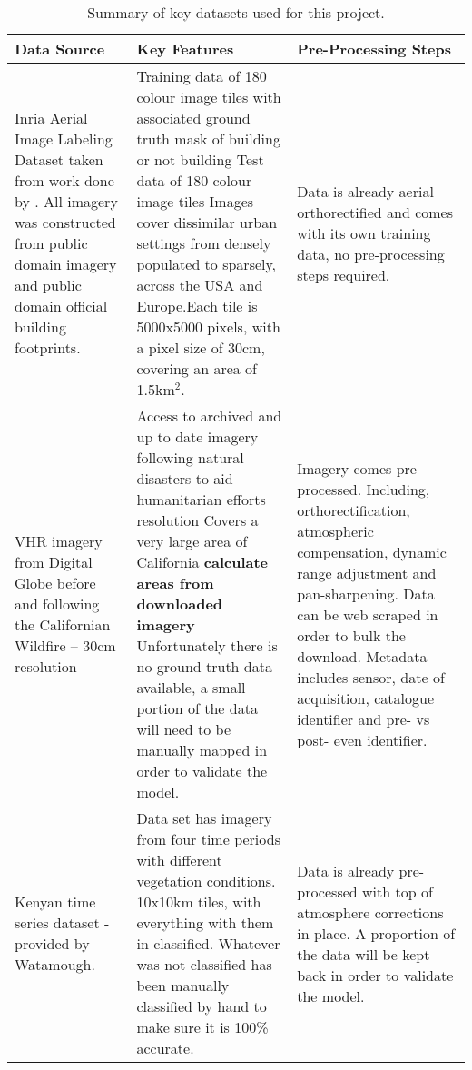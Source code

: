 \begin{table}
    \centering
    \caption{Summary of key datasets used for this project.}
\begin{tabular}{ p{1.5in} p{2in} p{1.5in} }\toprule
\textbf{Data Source}& \textbf{Key Features} & \textbf{Pre-Processing Steps} \\ \toprule
Inria Aerial Image Labeling Dataset taken from work done by \cite{maggiori17a}. All imagery was constructed from public domain imagery and public domain official building footprints. &Training data of 180 colour image tiles with associated ground truth mask of building or not building \newline Test data of 180 colour image tiles \newline Images cover dissimilar urban settings from densely populated to sparsely, across the USA and Europe.\newline Each tile is 5000x5000 pixels, with a pixel size of 30cm, covering an area of 1.5km$^2$. 
& Data is already aerial orthorectified and comes with its own training data, no pre-processing steps required.  \\ \midrule
VHR imagery from Digital Globe before and following the Californian Wildfire – 30cm resolution&
Access to archived and up to date imagery following natural disasters to aid humanitarian efforts \newline
30cm resolution \newline
Covers a very large area of California \textbf{calculate areas from downloaded imagery} \newline
Unfortunately there is no ground truth data available, a small portion of the data will need to be manually mapped in order to validate the model.
& Imagery comes pre-processed. Including, orthorectification, atmospheric compensation, dynamic range adjustment and pan-sharpening. \newline
Data can be web scraped in order to bulk the download.\newline
Metadata includes sensor, date of acquisition, catalogue identifier and pre- vs post- even identifier.
\\ \midrule
Kenyan time series dataset - provided by Watamough.& 
Data set has imagery from four time periods with different vegetation conditions. \newline
10x10km tiles, with everything with them in classified. Whatever was not classified has been manually classified by hand to make sure it is 100\% accurate. \newline &
Data is already pre-processed with top of atmosphere corrections in place. A proportion of the data will be kept back in order to validate the model.\\ \bottomrule
\end{tabular}
\label{tab.datasets}
\end{table}